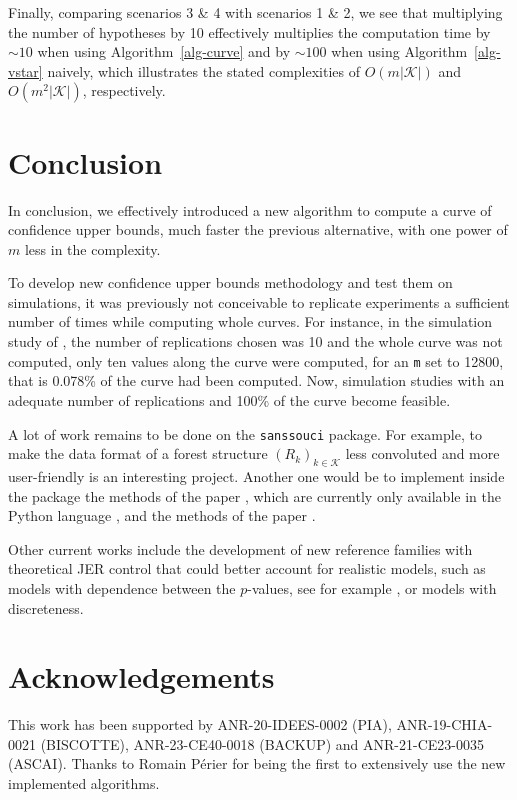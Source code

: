 \documentclass[
  11pt,
  a4paper,
]{article}
\theoremstyle{plain}
\theoremstyle{plain}
\theoremstyle{plain}
\theoremstyle{definition}
\theoremstyle{definition}
\theoremstyle{remark}
\begin{document}
Finally, comparing scenarios 3 \& 4 with scenarios 1 \& 2, we see that
multiplying the number of hypotheses by 10 effectively multiplies the
computation time by \(\sim10\) when using  Algorithm~\ref{alg-curve} 
and by \(\sim100\) when using  Algorithm~\ref{alg-vstar}  naively, which
illustrates the stated complexities of \(O(m|\mathcal{K}|)\) and
\(O(m^2|\mathcal{K}|)\), respectively.

\section{Conclusion}\label{conclusion}

In conclusion, we effectively introduced a new algorithm to compute a
curve of confidence upper bounds, much faster the previous alternative,
with one power of \(m\) less in the complexity.

To develop new confidence upper bounds methodology and test them on
simulations, it was previously not conceivable to replicate experiments
a sufficient number of times while computing whole curves. For instance,
in the simulation study of \citet{MR4178188}, the number of replications
chosen was 10 and the whole curve was not computed, only ten values
along the curve were computed, for an \texttt{m} set to 12800, that is
0.078\% of the curve had been computed. Now, simulation studies with an
adequate number of replications and 100\% of the curve become feasible.

A lot of work remains to be done on the \texttt{sanssouci} package. For
example, to make the data format of a forest structure
\((R_k)_{k\in\mathcal{K}}\) less convoluted and more user-friendly is an
interesting project. Another one would be to implement inside the
package the methods of the paper \citet{blain22notip}, which are
currently only available in the Python language \citep{10.5555/1593511},
and the methods of the paper \citet{JMLR:v25:23-1025}.

Other current works include the development of new reference families
with theoretical JER control that could better account for realistic
models, such as models with dependence between the \(p\)-values, see for
example \citet{perrot2023selective}, or models with discreteness.

\section{Acknowledgements}\label{acknowledgements}

This work has been supported by ANR-20-IDEES-0002 (PIA),
ANR-19-CHIA-0021 (BISCOTTE), ANR-23-CE40-0018 (BACKUP) and
ANR-21-CE23-0035 (ASCAI). Thanks to Romain Périer for being the first to
extensively use the new implemented algorithms.
\end{document}
